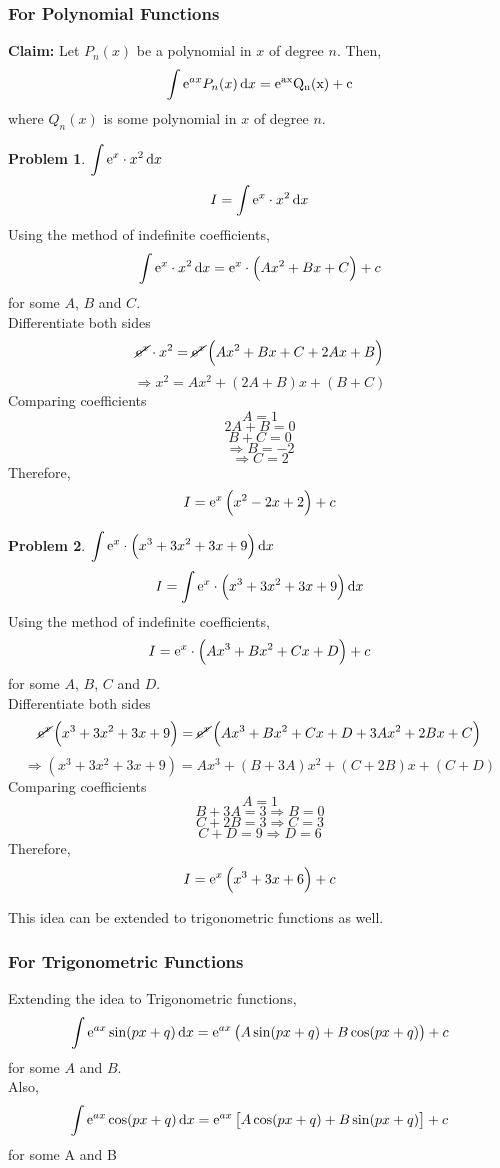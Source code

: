 \documentclass[14]{article}
\theoremstyle{definition}
\newtheorem{prob}{Problem}
\theoremstyle{case}
\begin{document}
\subsubsection{For Polynomial Functions}
\textbf{Claim: } Let $P_n(x)$ be a polynomial in $x$ of degree $n$. Then,
\[\int {\rm e}^{ax} P_n(x) \dif x = \rm {\rm e}^{ax} Q_n(x) + c\]
where $Q_n(x)$ is some polynomial in $x$ of degree $n$. 
\begin{prob}
$\displaystyle \int {\rm e}^x \cdot x^2 \dif x$
\[I = \int {\rm e}^x \cdot x^2 \dif x\]
Using the method of indefinite coefficients,\\
\[\int {\rm e}^x \cdot x^2 \dif x = {\rm e}^x \cdot \left(Ax^2 + Bx + C\right) + c\]
for some $A$, $B$ and $C$.\\
Differentiate both sides\\
\[\cancel{{\rm e}^x} \cdot x^2 = \cancel{{\rm e}^x} \left( Ax^2 + Bx + C + 2Ax + B \right)\]
\[\Rightarrow x^2 = Ax^2 + (2A + B)x + (B+C)\]
Comparing coefficients\\
\[A = 1\]
\[2A + B = 0\]
\[B + C = 0\]
\[\Rightarrow B = -2\]
\[\Rightarrow C = 2\]
Therefore,
\[I = {\rm e}^{x} \left(x^2 -2x + 2 \right) + c\]
\end{prob}
\pagebreak
\begin{prob}
$\displaystyle \int {\rm e}^x \cdot \left(x^3 + 3x^2 + 3x + 9\right) \dif x$
\[I = \int {\rm e}^x \cdot \left(x^3 + 3x^2 + 3x + 9\right) \dif x\]
Using the method of indefinite coefficients,\\
\[I = {\rm e}^x \cdot \left(Ax^3 + Bx^2 + Cx + D\right) + c\]
for some $A$, $B$, $C$ and $D$.\\
Differentiate both sides\\
\[\cancel{{\rm e}^x} \left(x^3 + 3x^2 + 3x + 9\right) = \cancel{{\rm e}^x} \left( Ax^3 + Bx^2 + Cx + D + 3Ax^2 + 2Bx + C \right)\]
\[\Rightarrow \left(x^3 + 3x^2 + 3x + 9\right) = Ax^3 + (B + 3A)x^2 + (C + 2B)x + (C + D)\]
Comparing coefficients\\
\[A = 1\]
\[B + 3A = 3 \Rightarrow B = 0\]
\[C + 2B = 3 \Rightarrow C = 3\]
\[C + D = 9 \Rightarrow D = 6\]
Therefore,
\[I = {\rm e}^{x} \left(x^3 + 3x + 6 \right) + c\]
\end{prob}
This idea can be extended to trigonometric functions as well.
\subsubsection{For Trigonometric Functions}
Extending the idea to Trigonometric functions,
\[\int {\rm e}^{ax} \sin(px+q) \dif x = {\rm e}^{ax} \left( A \sin(px+q) + B \cos(px+q) \right) + c\] for some $A$ and $B$.\\
Also,
\[\int {\rm e}^{ax} \cos(px+q) \dif x= {\rm e}^{ax}\left[ A \cos(px +q) + B \sin(px + q) \right] + c\]
for some A and B
\end{document}
